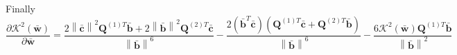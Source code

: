 Finally
\small
\begin{equation}\label{eq:cuvaturepartial}
\frac{
\partial 
\mathcal{K}^{2}(\mathbf{\bar{w}})
}
{
\partial \mathbf{\bar{w}}
}
=
\frac{
2
\left\|\mathbf{\bar{c}}\right\|^2
\mathbf{Q}^{(1)T} \mathbf{\bar{b}}
+
2
\left\|\mathbf{\bar{b}}\right\|^2
\mathbf{Q}^{(2)T} \mathbf{\bar{c}}
}
{\left\| \mathbf{\bar{b}} \right\|^{6}}
-
\frac
{
2
\left(
\mathbf{\bar{b}}^{T}
\mathbf{\bar{c}}
\right)
\left(
\mathbf{Q}^{(1)T}\mathbf{\bar{c}}
+
\mathbf{Q}^{(2)T}\mathbf{\bar{b}}
\right)
}
{\left\| \mathbf{\bar{b}} \right\|^{6}}
-
\frac
{
6
\mathcal{K}^{2}(\mathbf{\bar{w}})
\mathbf{Q}^{(1)T}\mathbf{\bar{b}}
}
{\left\| \mathbf{\bar{b}} \right\|^{2}}
\end{equation}
\normalsize